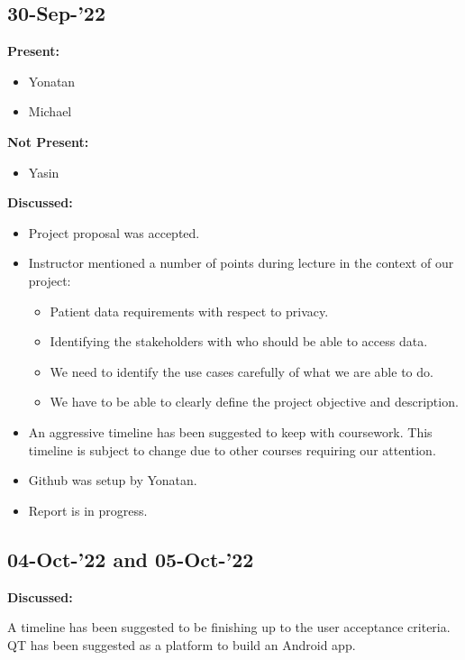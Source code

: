 \documentclass[11pt]{article}
\begin{document}
    \subsection{30-Sep-’22}\label{subsec:30-sep-22}

    \textbf{Present:}
    \begin{itemize}
        \item Yonatan
        \item Michael
    \end{itemize}

    \textbf{Not Present:}

    \begin{itemize}
        \item Yasin
    \end{itemize}

    \textbf{Discussed:}

    \begin{itemize}
        \item Project proposal was accepted.
        \item Instructor mentioned a number of points during lecture in the context of our project:
        \begin{itemize}
            \item Patient data requirements with respect to privacy.
            \item Identifying the stakeholders with who should be able to access data.
            \item We need to identify the use cases carefully of what we are able to do.
            \item We have to be able to clearly define the project objective and description.
        \end{itemize}
        \item An aggressive timeline has been suggested to keep with coursework.
        This timeline is subject to change due to other courses requiring our attention.
        \item Github was setup by Yonatan.
        \item Report is in progress.
    \end{itemize}

    \subsection{04-Oct-’22 and 05-Oct-’22}

    \textbf{Discussed:}

    A timeline has been suggested to be finishing up to the user acceptance criteria.
    QT has been suggested as a platform to build an Android app.
\end{document}
